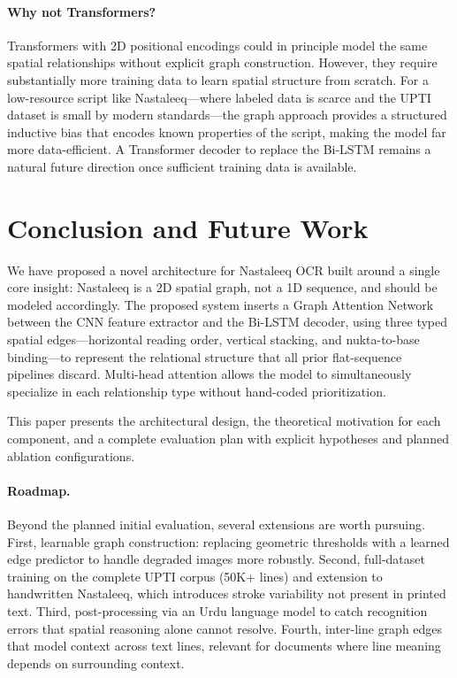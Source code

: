 \documentclass[11pt]{article}
\begin{document}
\paragraph{Why not Transformers?}
Transformers with 2D positional encodings could in principle model the same spatial
relationships without explicit graph construction.
However, they require substantially more training data to learn spatial structure from
scratch.
For a low-resource script like Nastaleeq---where labeled data is scarce and the UPTI
dataset is small by modern standards---the graph approach provides a structured
inductive bias that encodes known properties of the script, making the model far more
data-efficient.
A Transformer decoder to replace the Bi-LSTM remains a natural future direction once
sufficient training data is available.

\section{Conclusion and Future Work}

We have proposed a novel architecture for Nastaleeq OCR built around a single core
insight: Nastaleeq is a 2D spatial graph, not a 1D sequence, and should be modeled
accordingly.
The proposed system inserts a Graph Attention Network between the CNN feature extractor
and the Bi-LSTM decoder, using three typed spatial edges---horizontal reading order,
vertical stacking, and nukta-to-base binding---to represent the relational structure
that all prior flat-sequence pipelines discard.
Multi-head attention allows the model to simultaneously specialize in each relationship
type without hand-coded prioritization.

This paper presents the architectural design, the theoretical motivation for each
component, and a complete evaluation plan with explicit hypotheses and planned ablation
configurations.

\paragraph{Roadmap.}
Beyond the planned initial evaluation, several extensions are worth pursuing.
First, learnable graph construction: replacing geometric thresholds with a learned edge
predictor to handle degraded images more robustly.
Second, full-dataset training on the complete UPTI corpus (50K+ lines) and extension to
handwritten Nastaleeq, which introduces stroke variability not present in printed text.
Third, post-processing via an Urdu language model to catch recognition errors that
spatial reasoning alone cannot resolve.
Fourth, inter-line graph edges that model context across text lines, relevant for
documents where line meaning depends on surrounding context.
\end{document}
